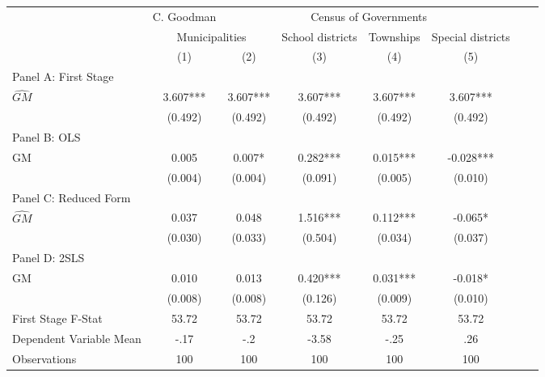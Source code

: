 \begin{tabular}{l*{7}{c}} \toprule
&\multicolumn{1}{c}{C. Goodman}&\multicolumn{4}{c}{Census of Governments}\\\cmidrule(lr){2-2}\cmidrule(lr){3-6}
&\multicolumn{2}{c}{Municipalities}&\multicolumn{1}{c}{School districts}&\multicolumn{1}{c}{Townships}&\multicolumn{1}{c}{Special districts}\\\cmidrule(lr){2-3}\cmidrule(lr){4-6}
&\multicolumn{1}{c}{(1)}&\multicolumn{1}{c}{(2)}&\multicolumn{1}{c}{(3)}&\multicolumn{1}{c}{(4)}&\multicolumn{1}{c}{(5)}\\
\cmidrule(lr){1-6}
\multicolumn{5}{l}{Panel A: First Stage}\\
\cmidrule(lr){1-6}
$\widehat{GM}$  &    3.607***&    3.607***&    3.607***&    3.607***&    3.607***\\
                &  (0.492)   &  (0.492)   &  (0.492)   &  (0.492)   &  (0.492)   \\
\cmidrule(lr){1-6}
\multicolumn{5}{l}{Panel B: OLS}\\
\cmidrule(lr){1-6}
GM              &    0.005   &    0.007*  &    0.282***&    0.015***&   -0.028***\\
                &  (0.004)   &  (0.004)   &  (0.091)   &  (0.005)   &  (0.010)   \\
\cmidrule(lr){1-6}
\multicolumn{5}{l}{Panel C: Reduced Form}\\
\cmidrule(lr){1-6}
$\widehat{GM}$  &    0.037   &    0.048   &    1.516***&    0.112***&   -0.065*  \\
                &  (0.030)   &  (0.033)   &  (0.504)   &  (0.034)   &  (0.037)   \\
\cmidrule(lr){1-6}
\multicolumn{5}{l}{Panel D: 2SLS}\\
\cmidrule(lr){1-6}
GM              &    0.010   &    0.013   &    0.420***&    0.031***&   -0.018*  \\
                &  (0.008)   &  (0.008)   &  (0.126)   &  (0.009)   &  (0.010)   \\
\midrule
First Stage F-Stat&    53.72   &    53.72   &    53.72   &    53.72   &    53.72   \\
Dependent Variable Mean&     -.17   &      -.2   &    -3.58   &     -.25   &      .26   \\
Observations    &      100   &      100   &      100   &      100   &      100   \\
 \bottomrule \end{tabular}
